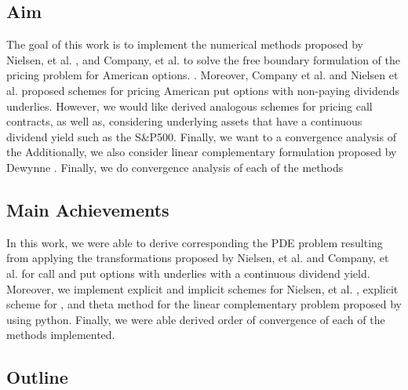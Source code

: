 \subsection{Aim} 

The goal of this work is to implement the numerical methods proposed by Nielsen, et al. \cite{nielsen_2001}, and Company, et al. \cite{company_egorova_jodar_2014} to solve the free boundary formulation of the pricing problem for American options. \cite {dewynne_howison_rupf_wilmott_1993}. Moreover, Company et al. \cite {company_egorova_jodar_2014} and Nielsen et al. \cite*{nielsen_2001} proposed schemes for pricing American put options with non-paying dividends underlies. However, we would like derived analogous schemes for pricing call contracts, as well as, considering underlying assets that have a continuous dividend yield such as the S\&P500. Finally, we want to a convergence analysis of the  Additionally, we also consider linear complementary formulation proposed by Dewynne \cite{dewynne_howison_rupf_wilmott_1993} \cite{wilmott_howison_dewynne_1995}. Finally, we do convergence analysis of each of the methods

\subsection{Main Achievements}

In this work, we were able to derive corresponding the PDE problem resulting from applying the transformations proposed by Nielsen, et al. \cite{nielsen_2001} and Company, et al. \cite{company_egorova_jodar_2014} for call and put options with underlies with a continuous dividend yield. Moreover, we implement explicit and implicit schemes for Nielsen, et al. \cite{nielsen_2001}, explicit scheme for \cite{company_egorova_jodar_2014}, and theta method for the linear complementary problem proposed by \cite{wilmott_howison_dewynne_1995} using python. Finally, we were able derived order of convergence of each of the methods implemented.

\subsection{Outline}

